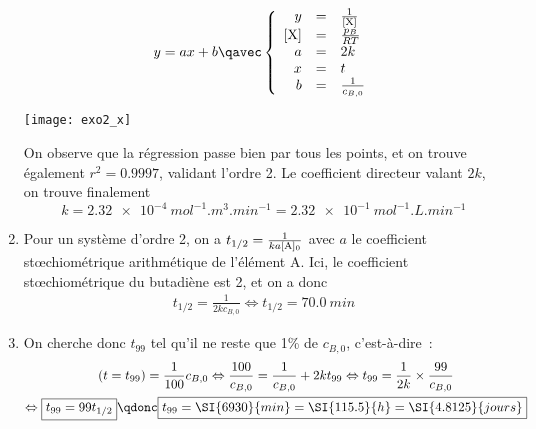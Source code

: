 \documentclass[a4paper, 12pt, final, garamond]{book}
\begin{document}
\begin{enumerate}
        \begin{minipage}{0.45\linewidth}
            \[  y = ax + b
                \qavec
                \left\{
                    \begin{array}{rcl}
                        y         & = & \frac{1}{[{\rm X}]}\\\relax
                        [{\rm X}] & = & \frac{p_B}{RT}\\
                        a         & = & 2k\\
                        x         & = & t\\
                        b         & = & \frac{1}{c_{B,0}}
                    \end{array}
                \right.
            \]
        \end{minipage}
        \begin{minipage}{0.55\linewidth}
            \begin{center}
                \texttt{[image: exo2\_x]}
            \end{center}
        \end{minipage}
        On observe que la régression passe bien par tous les points, et on
        trouve également $r^2 = \num{0.9997}$, validant l'ordre 2. Le
        coefficient directeur valant $2k$, on trouve finalement
        \[\boxed{k =
                \SI{2.32e-4}{mol^{-1}.m^3.min^{-1}}
                =
                \SI{2.32e-1}{mol^{-1}.L.min^{-1}}
            }
        \]
    \item Pour un système d'ordre 2, on a $t_{1/2} = \frac{1}{ka[{\rm A}]_0}$ avec
        $a$ le coefficient stœchiométrique arithmétique de l'élément A. Ici, le
        coefficient stœchiométrique du butadiène est 2, et on a donc
        \begin{gather*}
            t_{1/2} = \frac{1}{2kc_{B,0}}
            \Leftrightarrow
            \boxed{t_{1/2} = \SI{70.0}{min}}
        \end{gather*}
    \item On cherche donc $t_{99}$ tel qu'il ne reste que 1\% de $c_{B,0}$,
        c'est-à-dire~:
        \begin{gather*}
            [X](t = t_{99}) = \frac{1}{100}c_{B,0}
            \Leftrightarrow
            \frac{100}{c_{B,0}} = \frac{1}{c_{B,0}} + 2kt_{99}
            \Leftrightarrow
            t_{99} = \frac{1}{2k}\times \frac{99}{c_{B,0}}\\
            \Leftrightarrow
            \boxed{
            t_{99} = 99t_{1/2}
            }
            \qdonc
            \boxed{t_{99} = \SI{6930}{min} = \SI{115.5}{h} = \SI{4.8125}{jours}}
        \end{gather*}
\end{enumerate}
\end{document}
